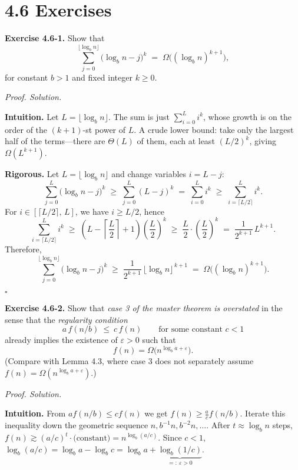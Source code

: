 \documentclass[12pt]{article}
\theoremstyle{definition}
\begin{document}
\newpage

\dotfill
\section*{4.6 Exercises}
\dotfill

\newpage

\noindent\textbf{Exercise 4.6-1.}
Show that
\[
\sum_{j=0}^{\lfloor \log_b n \rfloor}\big(\log_b n - j\big)^k
\;=\; \Omega\!\big((\log_b n)^{k+1}\big),
\]
for constant $b>1$ and fixed integer $k\ge 0$.

\medskip
\noindent\textit{Proof. Solution.}

\noindent\textbf{Intuition.}
Let $L=\lfloor \log_b n \rfloor$. The sum is just
$\sum_{i=0}^{L} i^k$, whose growth is on the order of the $(k{+}1)$-st power of $L$.
A crude lower bound: take only the largest half of the terms—there are $\Theta(L)$ of them,
each at least $(L/2)^k$, giving $\Omega(L^{k+1})$.

\noindent\textbf{Rigorous.}
Let $L=\lfloor \log_b n \rfloor$ and change variables $i=L-j$:
\[
\sum_{j=0}^{L}\big(\log_b n - j\big)^k
\;\ge\;\sum_{j=0}^{L}(L-j)^k
\;=\;\sum_{i=0}^{L} i^k
\;\ge\;\sum_{i=\lceil L/2\rceil}^{L} i^k.
\]
For $i\in[\lceil L/2\rceil,\,L]$, we have $i\ge L/2$, hence
\[
\sum_{i=\lceil L/2\rceil}^{L} i^k
\;\ge\; \left(L - \left\lceil\frac{L}{2}\right\rceil +1\right)\left(\frac{L}{2}\right)^k
\;\ge\; \frac{L}{2}\cdot \left(\frac{L}{2}\right)^k
\;=\; \frac{1}{2^{k+1}}\,L^{k+1}.
\]
Therefore,
\[
\sum_{j=0}^{\lfloor \log_b n \rfloor}\big(\log_b n - j\big)^k
\;\ge\; \frac{1}{2^{k+1}}\,\big\lfloor \log_b n \big\rfloor^{\,k+1}
\;=\; \Omega\!\big((\log_b n)^{k+1}\big).
\]

\hfill$\square$

\newpage

\noindent\textbf{Exercise 4.6-2.}
Show that \emph{case 3 of the master theorem is overstated} in the sense that the
\emph{regularity condition}
\[
a\,f(n/b)\ \le\ c\,f(n)\qquad\text{for some constant }c<1
\]
already implies the existence of $\varepsilon>0$ such that
\[
f(n)=\Omega\!\big(n^{\log_b a+\varepsilon}\big).
\]
(Compare with Lemma 4.3, where case 3 does not separately assume $f(n)=\Omega(n^{\log_b a+\varepsilon})$.)

\medskip
\noindent\textit{Proof. Solution.}

\noindent\textbf{Intuition.}
From $a f(n/b)\le c f(n)$ we get $f(n)\ge \frac{a}{c} f(n/b)$.
Iterate this inequality down the geometric sequence $n,b^{-1}n,b^{-2}n,\ldots$.
After $t\approx \log_b n$ steps, $f(n)\gtrsim (a/c)^t\cdot \text{(constant)}=n^{\log_b(a/c)}$.
Since $c<1$, $\log_b(a/c)=\log_b a-\log_b c=\log_b a+\underbrace{\log_b(1/c)}_{=:~\varepsilon>0}$.
\end{document}
